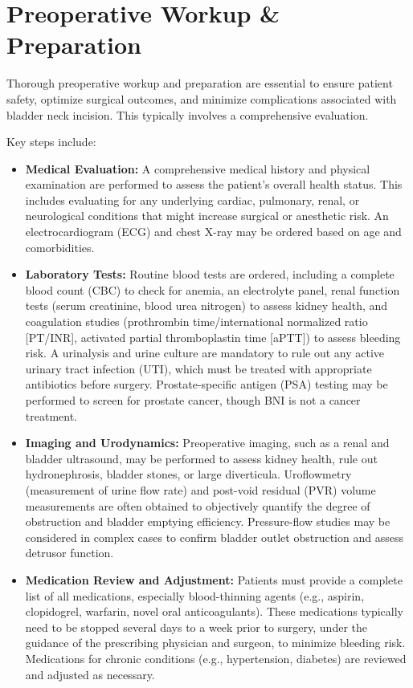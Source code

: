 \section*{Preoperative Workup \& Preparation}
Thorough preoperative workup and preparation are essential to ensure patient safety, optimize surgical outcomes, and minimize complications associated with bladder neck incision. This typically involves a comprehensive evaluation.

Key steps include:

\begin{itemize}
  \item \textbf{Medical Evaluation:} A comprehensive medical history and physical examination are performed to assess the patient's overall health status. This includes evaluating for any underlying cardiac, pulmonary, renal, or neurological conditions that might increase surgical or anesthetic risk. An electrocardiogram (ECG) and chest X-ray may be ordered based on age and comorbidities.
  
  \item \textbf{Laboratory Tests:} Routine blood tests are ordered, including a complete blood count (CBC) to check for anemia, an electrolyte panel, renal function tests (serum creatinine, blood urea nitrogen) to assess kidney health, and coagulation studies (prothrombin time/international normalized ratio [PT/INR], activated partial thromboplastin time [aPTT]) to assess bleeding risk. A urinalysis and urine culture are mandatory to rule out any active urinary tract infection (UTI), which must be treated with appropriate antibiotics before surgery. Prostate-specific antigen (PSA) testing may be performed to screen for prostate cancer, though BNI is not a cancer treatment.
  
  \item \textbf{Imaging and Urodynamics:} Preoperative imaging, such as a renal and bladder ultrasound, may be performed to assess kidney health, rule out hydronephrosis, bladder stones, or large diverticula. Uroflowmetry (measurement of urine flow rate) and post-void residual (PVR) volume measurements are often obtained to objectively quantify the degree of obstruction and bladder emptying efficiency. Pressure-flow studies may be considered in complex cases to confirm bladder outlet obstruction and assess detrusor function.
  
  \item \textbf{Medication Review and Adjustment:} Patients must provide a complete list of all medications, especially blood-thinning agents (e.g., aspirin, clopidogrel, warfarin, novel oral anticoagulants). These medications typically need to be stopped several days to a week prior to surgery, under the guidance of the prescribing physician and surgeon, to minimize bleeding risk. Medications for chronic conditions (e.g., hypertension, diabetes) are reviewed and adjusted as necessary.
  

\end{itemize}

